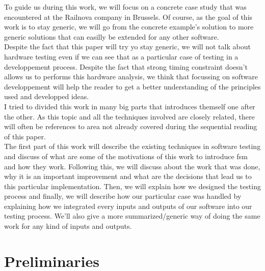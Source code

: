 \documentclass[12pt]{article}
\begin{document}
To guide us during this work, we will focus on a concrete case study that was encountered at the Railnova company in Brussels. Of course, as the goal of this work is to stay generic, we will go from the concrete example's solution to more generic solutions that can easilly be extended for any other software.\\

Despite the fact that this paper will try yo stay generic, we will not talk about hardware testing even if we can see that as a particular case of testing in a developpement process. Despite the fact that strong timing constraint doesn't allows us to performs this hardware analysis, we think that focussing on software developpement will help the reader to get a better understanding of the principles used and developped ideas.\\

I tried to divided this work in many big parts that introduces themself one after the other. As this topic and all the techniques involved are closely related, there will often be references to area not already covered during the sequential reading of this paper.\\

The first part of this work will describe the existing techniques in software testing and discuss of what are some of the motivations of this work to introduce \gls{fsm} and how they work. Following this, we will discuss about the work that was done, why it is an important improvement and what are the decisions that lead us to this particular implementation. Then, we will explain how we designed the testing process and finally, we will describe how our particular case was handled by explaining how we integrated every inputs and outputs of our software into our testing process. We'll also give a more summarized/generic way of doing the same work for any kind of inputs and outputs.



\clearpage
\part{Preliminaries}
\end{document}
